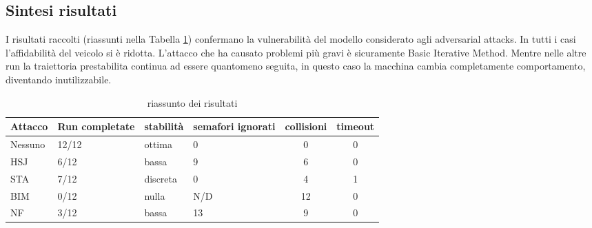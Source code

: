 \subsection{Sintesi risultati}
I risultati raccolti (riassunti nella Tabella \ref{tab:ria}) confermano la vulnerabilità del modello considerato agli adversarial attacks. In tutti i casi l'affidabilità del veicolo si è ridotta.
L'attacco che ha causato problemi più gravi è sicuramente Basic Iterative Method. Mentre nelle altre run la traiettoria prestabilita continua ad essere quantomeno seguita, in questo
caso la macchina cambia completamente comportamento, diventando inutilizzabile.
\begin{table}[h]
    \begin{tabular}{|p{1.5cm}|p{2.5cm}|p{2cm}|p{1.5cm}|c|c|}
        \hline
        Attacco        &   Run completate     &   stabilità     &  semafori ignorati        & collisioni & timeout\\
        \hline
        Nessuno        &  12/12               &   ottima        &  0                       & 0          & 0 \\
        HSJ            &  6/12                &   bassa         &  9                        & 6          & 0 \\
        STA            &  7/12                &   discreta      &  0                        & 4          & 1 \\
        BIM            &  0/12                &   nulla         &  N/D                      & 12         & 0\\
        NF             &  3/12                &   bassa         &   13                      & 9          & 0 \\
        \hline
    \end{tabular}
    \caption{riassunto dei risultati}
    \label{tab:ria}
\end{table}